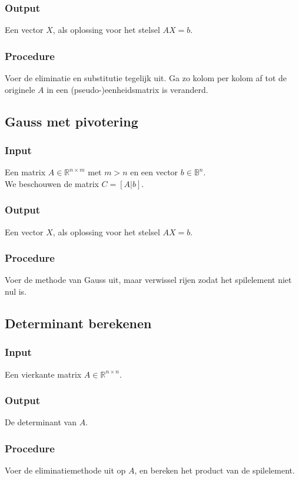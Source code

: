 \documentclass[samenvatting.tex]{subfiles}
\begin{document}
\subsubsection*{Output}
Een vector $X$, als oplossing voor het stelsel $AX=b$.
\subsubsection*{Procedure}
Voer de eliminatie en substitutie tegelijk uit. Ga zo kolom per kolom af tot de originele $A$ in een (pseudo-)eenheidsmatrix is veranderd.

\subsection{Gauss met pivotering}
\subsubsection*{Input}
Een matrix $A \in \mathbb{R}^{n\times m}$ met $m>n$ en een vector $b \in \mathbb{B}^{n}$.\\
We beschouwen de matrix $C = [A|b]$.
\subsubsection*{Output}
Een vector $X$, als oplossing voor het stelsel $AX=b$.
\subsubsection*{Procedure}
Voer de methode van Gauss uit, maar verwissel rijen zodat het spilelement niet nul is.

\subsection{Determinant berekenen}
\subsubsection*{Input}
Een vierkante matrix $A\in\mathbb{R}^{n\times n}$.
\subsubsection*{Output}
De determinant van $A$.
\subsubsection*{Procedure}
Voer de eliminatiemethode uit op $A$, en bereken het product van de spilelement.
\end{document}
